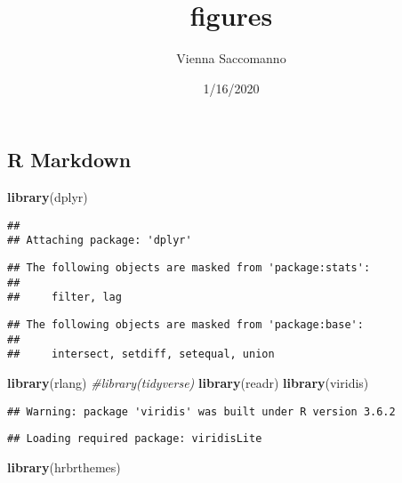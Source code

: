 \documentclass[
]{article}
\title{figures}
\author{Vienna Saccomanno}
\date{1/16/2020}
\newenvironment{Shaded}{\begin{snugshade}}{\end{snugshade}}
\newcommand{\CommentTok}[1]{\textcolor[rgb]{0.56,0.35,0.01}{\textit{#1}}}
\newcommand{\KeywordTok}[1]{\textcolor[rgb]{0.13,0.29,0.53}{\textbf{#1}}}
\newcommand{\NormalTok}[1]{#1}
\begin{document}
\maketitle

\hypertarget{r-markdown}{%
\subsection{R Markdown}\label{r-markdown}}

\begin{Shaded}
\begin{Highlighting}[]
\KeywordTok{library}\NormalTok{(dplyr)}
\end{Highlighting}
\end{Shaded}

\begin{verbatim}
## 
## Attaching package: 'dplyr'
\end{verbatim}

\begin{verbatim}
## The following objects are masked from 'package:stats':
## 
##     filter, lag
\end{verbatim}

\begin{verbatim}
## The following objects are masked from 'package:base':
## 
##     intersect, setdiff, setequal, union
\end{verbatim}

\begin{Shaded}
\begin{Highlighting}[]
\KeywordTok{library}\NormalTok{(rlang)}
\CommentTok{#library(tidyverse)}
\KeywordTok{library}\NormalTok{(readr)}
\KeywordTok{library}\NormalTok{(viridis)}
\end{Highlighting}
\end{Shaded}

\begin{verbatim}
## Warning: package 'viridis' was built under R version 3.6.2
\end{verbatim}

\begin{verbatim}
## Loading required package: viridisLite
\end{verbatim}

\begin{Shaded}
\begin{Highlighting}[]
\KeywordTok{library}\NormalTok{(hrbrthemes)}
\end{Highlighting}
\end{Shaded}
\end{document}
